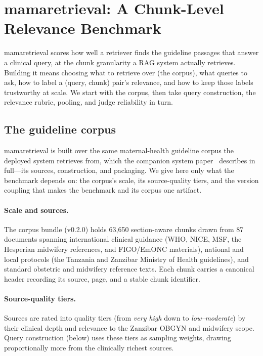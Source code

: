 \section{mamaretrieval: A Chunk-Level Relevance Benchmark}
\label{sec:mamaretrieval}

mamaretrieval scores how well a retriever finds the guideline passages that
answer a clinical query, at the chunk granularity a RAG system actually
retrieves. Building it means choosing what to retrieve over (the corpus), what
queries to ask, how to label a (query, chunk) pair's relevance, and how to keep
those labels trustworthy at scale. We start with the corpus, then take query
construction, the relevance rubric, pooling, and judge reliability in turn.

\subsection{The guideline corpus}
\label{sec:corpus}

mamaretrieval is built over the same maternal-health guideline corpus the
deployed system retrieves from, which the companion system
paper~\cite{ren2026mamai} describes in full---its sources, construction, and
packaging. We give here only what the benchmark depends on: the corpus's scale,
its source-quality tiers, and the version coupling that makes the benchmark and
its corpus one artifact.

\paragraph{Scale and sources.}
The corpus bundle (v0.2.0) holds 63{,}650 section-aware chunks drawn from 87
documents spanning international clinical guidance (WHO, NICE, MSF, the
Hesperian midwifery references, and FIGO/EmONC materials), national and local
protocols (the Tanzania and Zanzibar Ministry of Health guidelines), and
standard obstetric and midwifery reference texts. Each chunk carries a canonical
header recording its source, page, and a stable chunk identifier.

\paragraph{Source-quality tiers.}
Sources are rated into quality tiers (from \emph{very high} down to
\emph{low--moderate}) by their clinical depth and relevance to the
Zanzibar OBGYN and midwifery scope. Query construction (below) uses these tiers
as sampling weights, drawing proportionally more from the clinically richest
sources.

